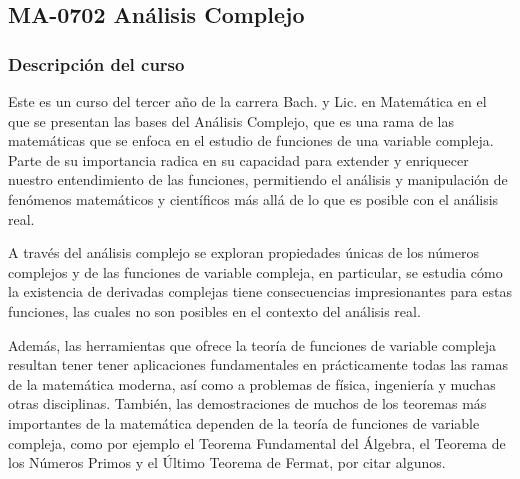 \newpage
\subsection*{MA-0702 Análisis Complejo}

\begin{refsection}
\begin{table}[H]
\end{table}



\subsubsection*{Descripción del curso}

Este es un curso del tercer año de la carrera Bach. y Lic. en Matemática en el que se presentan las bases del Análisis Complejo, que es una rama de las matemáticas que se enfoca en el estudio de funciones de una variable compleja. Parte de su importancia radica en su capacidad para extender y enriquecer nuestro entendimiento de las funciones, permitiendo el análisis y manipulación de fenómenos matemáticos y científicos más allá de lo que es posible con el análisis real. 

A través del análisis complejo se exploran propiedades únicas de los números complejos y de las funciones de variable compleja, en particular, se estudia cómo la existencia de derivadas complejas tiene consecuencias impresionantes para estas funciones, las cuales no son posibles en el contexto del análisis real.

Además, las herramientas que ofrece la teoría de funciones de variable compleja resultan tener tener aplicaciones fundamentales en prácticamente todas las ramas de la matemática moderna, así como a problemas de física, ingeniería y muchas otras disciplinas. También, las demostraciones de muchos de los teoremas más importantes de la matemática dependen de la teoría de funciones de variable compleja, como por ejemplo el Teorema Fundamental del Álgebra, el Teorema de los Números Primos y el Último Teorema de Fermat, por citar algunos. 




\end{refsection}
